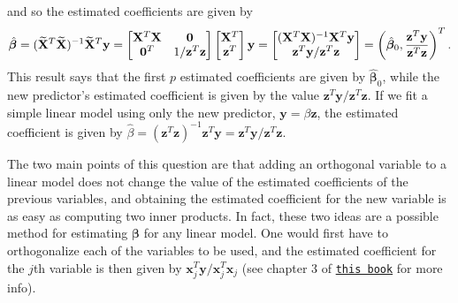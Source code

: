 \documentclass[10pt]{article}
\begin{document}
and so the estimated coefficients are given by 
\begin{align}
    \hat{\bm{\beta}}
    = (\widetilde{\mathbf{X}}^T\widetilde{\mathbf{X}})^{-1}\widetilde{\mathbf{X}}^T\mathbf{y}
    = \begin{bmatrix}
        \mathbf{X}^T\mathbf{X} & \mathbf{0} \\
        \mathbf{0}^T & 1 / \mathbf{z}^T\mathbf{z}
    \end{bmatrix}
    \begin{bmatrix}
        \mathbf{X}^T \\ \mathbf{z}^T
    \end{bmatrix}
    \mathbf{y}
    = \begin{bmatrix}
        (\mathbf{X}^T\mathbf{X})^{-1}\mathbf{X}^T\mathbf{y} \\
        \mathbf{z}^T\mathbf{y} / \mathbf{z}^T\mathbf{z}
    \end{bmatrix}
    = \left( \hat{\bm{\beta}}_0, \frac{\mathbf{z}^T\mathbf{y}}{\mathbf{z}^T\mathbf{z}} \right)^T.
\end{align}
This result says that the first \(p\) estimated coefficients are given by \(\hat{\bm{\beta}}_0\), while the new predictor's estimated coefficient is 
given by the value \(\mathbf{z}^T\mathbf{y} / \mathbf{z}^T\mathbf{z}\). If we fit a simple linear model using only the new predictor, 
\(\mathbf{y} = \beta \mathbf{z}\), the estimated coefficient is given by 
\(\hat{\beta} = (\mathbf{z}^T\mathbf{z})^{-1}\mathbf{z}^T\mathbf{y} = \mathbf{z}^T\mathbf{y} / \mathbf{z}^T\mathbf{z}\).

The two main points of this question are that adding an orthogonal variable to a linear model does not change the value of the estimated coefficients 
of the previous variables, and obtaining the estimated coefficient for the new variable is as easy as computing two inner products. 
In fact, these two ideas are a possible method for estimating \(\bm{\beta}\) for any linear model. One would first have to orthogonalize each of the 
variables to be used, and the estimated coefficient for the \(j\)th variable is then given by \(\mathbf{x}_j^T\mathbf{y} / \mathbf{x}_j^T\mathbf{x}_j\)
(see chapter 3 of \href{https://web.stanford.edu/~hastie/ElemStatLearn/}{\texttt{this book}} for more info).

\end{document}
